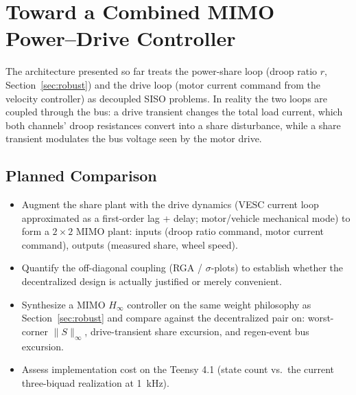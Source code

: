 \section{Toward a Combined MIMO Power--Drive Controller}
\label{sec:mimo}


The architecture presented so far treats the power-share loop (droop ratio $r$,
Section~\ref{sec:robust}) and the drive loop (motor current command from the velocity
controller) as decoupled SISO problems. In reality the two loops are coupled through the
bus: a drive transient changes the total load current, which both channels' droop
resistances convert into a share disturbance, while a share transient modulates the bus
voltage seen by the motor drive.

\subsection{Planned Comparison}
\begin{itemize}
    \item Augment the share plant with the drive dynamics (VESC current loop approximated
          as a first-order lag + delay; motor/vehicle mechanical mode) to form a
          $2\times 2$ MIMO plant: inputs (droop ratio command, motor current command),
          outputs (measured share, wheel speed).
    \item Quantify the off-diagonal coupling (RGA / $\sigma$-plots) to establish whether
          the decentralized design is actually justified or merely convenient.
    \item Synthesize a MIMO $H_\infty$ controller on the same weight philosophy as
          Section~\ref{sec:robust} and compare against the decentralized pair on:
          worst-corner $\|S\|_\infty$, drive-transient share excursion, and regen-event
          bus excursion.
    \item Assess implementation cost on the Teensy 4.1 (state count vs.\ the current
          three-biquad realization at 1~kHz).
\end{itemize}

